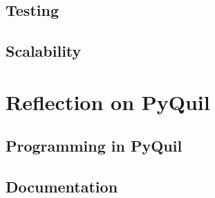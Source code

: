 \documentclass[12pt]{article}
\begin{document}
\subsection{Testing}

\subsection{Scalability}

\section{Reflection on PyQuil}

\subsection{Programming in PyQuil}

\subsection{Documentation}

\bib
\end{document}
